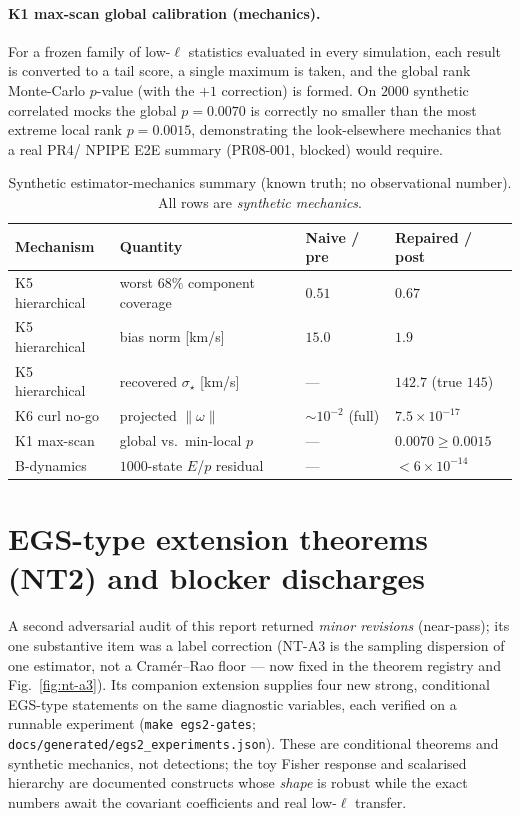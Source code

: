 \documentclass[11pt,a4paper]{article}
\theoremstyle{plain}
\theoremstyle{definition}
\begin{document}
\paragraph{K1 max-scan global calibration (mechanics).}
For a frozen family of low-$\ell$ statistics evaluated in every
simulation, each result is converted to a tail score, a single maximum
is taken, and the global rank Monte-Carlo $p$-value (with the $+1$
correction) is formed. On $2000$ synthetic correlated mocks the global
$p=0.0070$ is correctly no smaller than the most extreme local rank
$p=0.0015$, demonstrating the look-elsewhere mechanics that a real PR4/
NPIPE E2E summary (PR08-001, blocked) would require.

\begin{table}[ht]
\centering
\caption{Synthetic estimator-mechanics summary (known truth; no
observational number). All rows are \emph{synthetic mechanics}.}
\label{tab:mech}
\begin{tabular}{llll}
\toprule
Mechanism & Quantity & Naive / pre & Repaired / post \\
\midrule
K5 hierarchical & worst $68\%$ component coverage & $0.51$ & $0.67$ \\
K5 hierarchical & bias norm [km/s] & $15.0$ & $1.9$ \\
K5 hierarchical & recovered $\sigma_\star$ [km/s] & --- & $142.7$ (true $145$) \\
K6 curl no-go & projected $\|\omega\|$ & $\sim\!10^{-2}$ (full) & $7.5\times10^{-17}$ \\
K1 max-scan & global vs.\ min-local $p$ & --- & $0.0070\!\ge\!0.0015$ \\
B-dynamics & $1000$-state $E$/$p$ residual & --- & $<6\times10^{-14}$ \\
\bottomrule
\end{tabular}
\end{table}

\section{EGS-type extension theorems (NT2) and blocker discharges}
\label{sec:egs2}

A second adversarial audit of this report returned \emph{minor revisions}
(near-pass); its one substantive item was a label correction (NT-A3 is the
sampling dispersion of one estimator, not a Cram\'er--Rao floor --- now fixed in
the theorem registry and Fig.~\ref{fig:nt-a3}). Its companion extension supplies
four new strong, conditional EGS-type statements on the same diagnostic
variables, each verified on a runnable experiment
(\texttt{make egs2-gates}; \texttt{docs/generated/egs2\_experiments.json}). These
are conditional theorems and synthetic mechanics, not detections; the toy Fisher
response and scalarised hierarchy are documented constructs whose \emph{shape} is
robust while the exact numbers await the covariant coefficients and real low-$\ell$
transfer.
\end{document}
